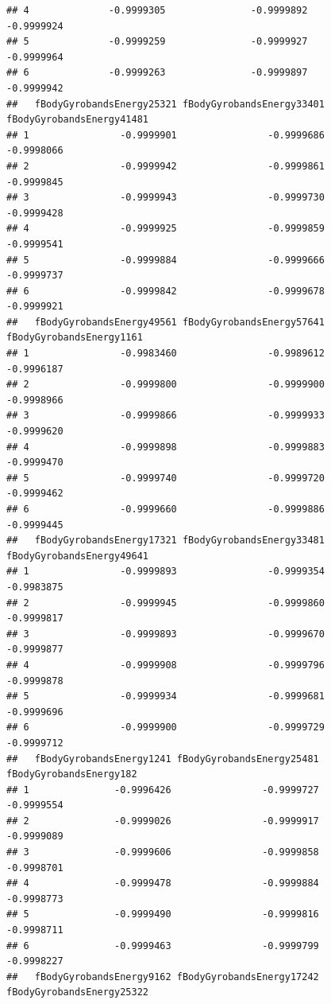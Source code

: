 \documentclass[
]{article}
\begin{document}
\begin{verbatim}
## 4              -0.9999305               -0.9999892                -0.9999924
## 5              -0.9999259               -0.9999927                -0.9999964
## 6              -0.9999263               -0.9999897                -0.9999942
##   fBodyGyrobandsEnergy25321 fBodyGyrobandsEnergy33401 fBodyGyrobandsEnergy41481
## 1                -0.9999901                -0.9999686                -0.9998066
## 2                -0.9999942                -0.9999861                -0.9999845
## 3                -0.9999943                -0.9999730                -0.9999428
## 4                -0.9999925                -0.9999859                -0.9999541
## 5                -0.9999884                -0.9999666                -0.9999737
## 6                -0.9999842                -0.9999678                -0.9999921
##   fBodyGyrobandsEnergy49561 fBodyGyrobandsEnergy57641 fBodyGyrobandsEnergy1161
## 1                -0.9983460                -0.9989612               -0.9996187
## 2                -0.9999800                -0.9999900               -0.9998966
## 3                -0.9999866                -0.9999933               -0.9999620
## 4                -0.9999898                -0.9999883               -0.9999470
## 5                -0.9999740                -0.9999720               -0.9999462
## 6                -0.9999660                -0.9999886               -0.9999445
##   fBodyGyrobandsEnergy17321 fBodyGyrobandsEnergy33481 fBodyGyrobandsEnergy49641
## 1                -0.9999893                -0.9999354                -0.9983875
## 2                -0.9999945                -0.9999860                -0.9999817
## 3                -0.9999893                -0.9999670                -0.9999877
## 4                -0.9999908                -0.9999796                -0.9999878
## 5                -0.9999934                -0.9999681                -0.9999696
## 6                -0.9999900                -0.9999729                -0.9999712
##   fBodyGyrobandsEnergy1241 fBodyGyrobandsEnergy25481 fBodyGyrobandsEnergy182
## 1               -0.9996426                -0.9999727              -0.9999554
## 2               -0.9999026                -0.9999917              -0.9999089
## 3               -0.9999606                -0.9999858              -0.9998701
## 4               -0.9999478                -0.9999884              -0.9998773
## 5               -0.9999490                -0.9999816              -0.9998711
## 6               -0.9999463                -0.9999799              -0.9998227
##   fBodyGyrobandsEnergy9162 fBodyGyrobandsEnergy17242 fBodyGyrobandsEnergy25322

\end{verbatim}
\end{document}
